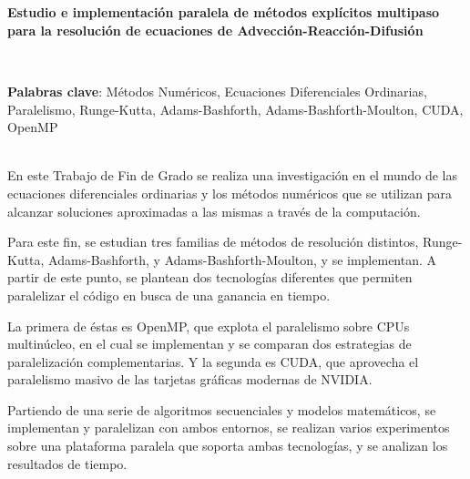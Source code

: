 \chapter*{}


%



\thispagestyle{empty}

\begin{center}
{ \large\bfseries Estudio e implementación paralela de métodos explícitos multipaso para la resolución de ecuaciones de Advección-Reacción-Difusión } \\
\end{center}
\begin{center}
\myName \\
\end{center}

\vspace{0.7cm}
\noindent\textbf{Palabras clave}: Métodos Numéricos, Ecuaciones Diferenciales Ordinarias, Paralelismo, Runge-Kutta, Adams-Bashforth, Adams-Bashforth-Moulton, CUDA, OpenMP

\vspace{0.7cm}
\\

En este Trabajo de Fin de Grado se realiza una investigación en el mundo de las ecuaciones diferenciales ordinarias y los métodos numéricos que se utilizan para alcanzar soluciones aproximadas a las mismas a través de la computación.

Para este fin, se estudian tres familias de métodos de resolución distintos, Runge-Kutta, Adams-Bashforth, y Adams-Bashforth-Moulton, y se implementan. A partir de este punto, se plantean dos tecnologías diferentes que permiten paralelizar el código en busca de una ganancia en tiempo. 

La primera de éstas es OpenMP, que explota el paralelismo sobre CPUs multinúcleo, en el cual se implementan y se comparan dos estrategias de paralelización complementarias. Y la segunda es CUDA, que aprovecha el paralelismo masivo de las tarjetas gráficas modernas de NVIDIA. 

Partiendo de una serie de algoritmos secuenciales y modelos matemáticos, se implementan y paralelizan con ambos entornos, se realizan varios experimentos sobre una plataforma paralela que soporta ambas tecnologías, y se analizan los resultados de tiempo.
\cleardoublepage


